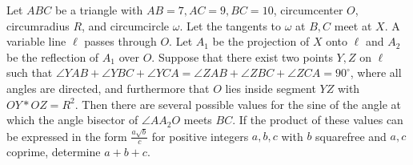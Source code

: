 Let $ABC$ be a triangle with $AB=7, AC=9, BC=10$, circumcenter $O$, circumradius $R$, and circumcircle $\omega$. Let the tangents to $\omega$ at $B,C$ meet at $X$. A variable line $\ell$ passes through $O$. Let $A_1$ be the projection of $X$ onto $\ell$ and $A_2$ be the reflection of $A_1$ over $O$. Suppose that there exist two points $Y,Z$ on $\ell$ such that $\angle YAB+\angle YBC+\angle YCA=\angle ZAB+\angle ZBC+\angle ZCA=90^{\circ}$, where all angles are directed, and furthermore that $O$ lies inside segment $YZ$ with $OY*OZ=R^2$. Then there are several possible values for the sine of the angle at which the angle bisector of $\angle AA_2O$ meets $BC$. If the product of these values can be expressed in the form $\frac{a\sqrt{b}}{c}$ for positive integers $a,b,c$ with $b$ squarefree and $a,c$ coprime, determine $a+b+c$.
